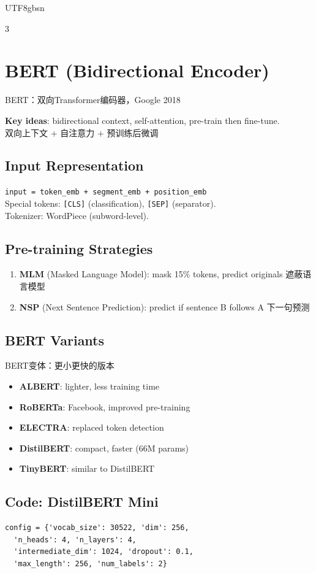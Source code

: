 \documentclass[9pt,landscape,a4paper]{article}
\newcommand{\zhint}[1]{{\scriptsize\color{gray!70!black}#1}}
\begin{document}
\begin{CJK}{UTF8}{gbsn}
\begin{multicols}{3}
\section{BERT (Bidirectional Encoder)}
\zhint{BERT：双向Transformer编码器，Google 2018}

\textbf{Key ideas}: bidirectional context, self-attention, pre-train then fine-tune.\\
\zhint{双向上下文 + 自注意力 + 预训练后微调}

\subsection{Input Representation}
\texttt{input = token\_emb + segment\_emb + position\_emb}\\
Special tokens: \texttt{[CLS]} (classification), \texttt{[SEP]} (separator).\\
Tokenizer: WordPiece (subword-level).

\subsection{Pre-training Strategies}
\begin{enumerate}[leftmargin=10pt,itemsep=0pt,topsep=0pt]
\item \textbf{MLM} (Masked Language Model): mask 15\% tokens, predict originals \zhint{遮蔽语言模型}
\item \textbf{NSP} (Next Sentence Prediction): predict if sentence B follows A \zhint{下一句预测}
\end{enumerate}

\subsection{BERT Variants}
\zhint{BERT变体：更小更快的版本}
\begin{itemize}[leftmargin=8pt,itemsep=0pt,topsep=0pt]
\item \textbf{ALBERT}: lighter, less training time
\item \textbf{RoBERTa}: Facebook, improved pre-training
\item \textbf{ELECTRA}: replaced token detection
\item \textbf{DistilBERT}: compact, faster (66M params)
\item \textbf{TinyBERT}: similar to DistilBERT
\end{itemize}

\subsection{Code: DistilBERT Mini}
\begin{lstlisting}
config = {'vocab_size': 30522, 'dim': 256,
  'n_heads': 4, 'n_layers': 4,
  'intermediate_dim': 1024, 'dropout': 0.1,
  'max_length': 256, 'num_labels': 2}


\end{lstlisting}
\end{multicols}
\end{CJK}
\end{document}

